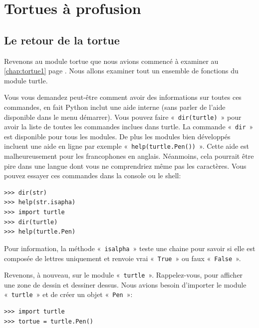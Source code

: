




\chapter{Tortues à profusion\label{chap:tortue2}}
\section{Le retour de la tortue}
Revenons au module tortue que nous avions commencé à examiner au \autoref{chap:tortue1} page \pageref{chap:tortue1}. Nous allons examiner tout un ensemble de fonctions du module turtle. 

Vous vous demandez peut-être comment avoir des informations sur toutes ces commandes, en fait Python inclut une aide interne (sans parler de l'aide disponible dans le menu démarrer). Vous pouvez faire «~\texttt{dir(turtle)}~» pour avoir la liste de toutes les commandes inclues dans turtle. La commande «~\texttt{dir}~» est disponible pour tous les modules. De plus les modules bien développés incluent une aide en ligne par exemple «~\texttt{help(turtle.Pen())}~». Cette aide est malheureusement pour les francophones en anglais. Néanmoins, cela pourrait être pire dans une langue dont vous  ne comprendriez même pas les caractères. Vous pouvez essayer ces commandes dans la console ou le shell:

\begin{Verbatim}[frame=single,rulecolor=\color{mbleu}, label=à taper]
>>> dir(str)
>>> help(str.isapha)
>>> import turtle
>>> dir(turtle)
>>> help(turtle.Pen)
\end{Verbatim}

Pour information, la méthode «~\texttt{isalpha}~» teste une chaine pour savoir si elle est composée de lettres uniquement et renvoie vrai «~\texttt{True}~» ou faux «~\texttt{False}~».

Revenons, à  nouveau, sur le module «~\texttt{turtle}~». Rappelez-vous, pour afficher une zone de dessin et dessiner dessus. Nous avions besoin d'importer le module «~\texttt{turtle}~» et de créer un objet «~\texttt{Pen}~»:
\begin{Verbatim}[frame=single,rulecolor=\color{gray}, label=ne pas saisir]
>>> import turtle
>>> tortue = turtle.Pen()
\end{Verbatim}


